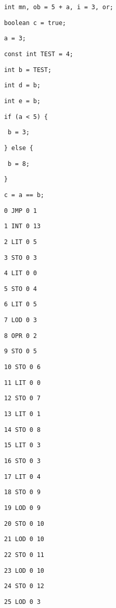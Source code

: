 \documentclass[czech]{thesiskiv}
\begin{document}
\texttt{int mn, ob = 5 + a, i = 3, or;}

\texttt{boolean c = true; }

\texttt{a = 3;}

\texttt{const int TEST = 4;}

\texttt{int b = TEST;}

\texttt{int d = b;}

\texttt{int e = b;}

\texttt{if (a < 5) \{ }

\texttt{    b = 3; }
    
\texttt{\} else \{ }

\texttt{    b = 8; }
    
\texttt{\} }

\texttt{c = a == b;}




\texttt{0	JMP	0	1}

\texttt{1	INT	0	13}

\texttt{2	LIT	0	5 }

\texttt{3	STO	0	3 }

\texttt{4	LIT	0	0 }

\texttt{5	STO	0	4 }

\texttt{6	LIT	0	5 }

\texttt{7	LOD	0	3 }

\texttt{8	OPR	0	2 }
                   
\texttt{9	STO	0	5  }

\texttt{10	STO	0	6 }

\texttt{11	LIT	0	0  }

\texttt{12	STO	0	7   }

\texttt{13	LIT	0	1    }

\texttt{14	STO	0	8     }

\texttt{15	LIT	0	3      }

\texttt{16	STO	0	3       }

\texttt{17	LIT	0	4      }

\texttt{18	STO	0	9 }

\texttt{19	LOD	0	9  }

\texttt{20	STO	0	10  }

\texttt{21	LOD	0	10   }

\texttt{22	STO	0	11    }

\texttt{23	LOD	0	10     }

\texttt{24	STO	0	12      }

\texttt{25	LOD	0	3        }
\end{document}

